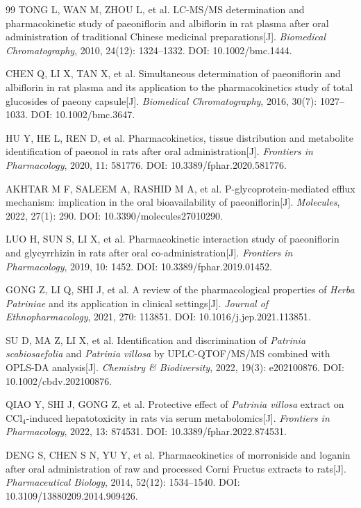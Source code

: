 \documentclass[12pt,a4paper,UTF8,openany]{ctexbook}
\begin{document}
\begin{thebibliography}{99}
TONG L, WAN M, ZHOU L, et al. LC-MS/MS determination and pharmacokinetic study of paeoniflorin and albiflorin in rat plasma after oral administration of traditional Chinese medicinal preparations[J]. \textit{Biomedical Chromatography}, 2010, 24(12): 1324--1332. DOI: 10.1002/bmc.1444.

CHEN Q, LI X, TAN X, et al. Simultaneous determination of paeoniflorin and albiflorin in rat plasma and its application to the pharmacokinetics study of total glucosides of paeony capsule[J]. \textit{Biomedical Chromatography}, 2016, 30(7): 1027--1033. DOI: 10.1002/bmc.3647.

HU Y, HE L, REN D, et al. Pharmacokinetics, tissue distribution and metabolite identification of paeonol in rats after oral administration[J]. \textit{Frontiers in Pharmacology}, 2020, 11: 581776. DOI: 10.3389/fphar.2020.581776.

AKHTAR M F, SALEEM A, RASHID M A, et al. P-glycoprotein-mediated efflux mechanism: implication in the oral bioavailability of paeoniflorin[J]. \textit{Molecules}, 2022, 27(1): 290. DOI: 10.3390/molecules27010290.

LUO H, SUN S, LI X, et al. Pharmacokinetic interaction study of paeoniflorin and glycyrrhizin in rats after oral co-administration[J]. \textit{Frontiers in Pharmacology}, 2019, 10: 1452. DOI: 10.3389/fphar.2019.01452.

GONG Z, LI Q, SHI J, et al. A review of the pharmacological properties of \textit{Herba Patriniae} and its application in clinical settings[J]. \textit{Journal of Ethnopharmacology}, 2021, 270: 113851. DOI: 10.1016/j.jep.2021.113851.

SU D, MA Z, LI X, et al. Identification and discrimination of \textit{Patrinia scabiosaefolia} and \textit{Patrinia villosa} by UPLC-QTOF/MS/MS combined with OPLS-DA analysis[J]. \textit{Chemistry \& Biodiversity}, 2022, 19(3): e202100876. DOI: 10.1002/cbdv.202100876.

QIAO Y, SHI J, GONG Z, et al. Protective effect of \textit{Patrinia villosa} extract on CCl$_4$-induced hepatotoxicity in rats via serum metabolomics[J]. \textit{Frontiers in Pharmacology}, 2022, 13: 874531. DOI: 10.3389/fphar.2022.874531.

DENG S, CHEN S N, YU Y, et al. Pharmacokinetics of morroniside and loganin after oral administration of raw and processed Corni Fructus extracts to rats[J]. \textit{Pharmaceutical Biology}, 2014, 52(12): 1534--1540. DOI: 10.3109/13880209.2014.909426.

\end{thebibliography}
\endgroup
\end{document}
